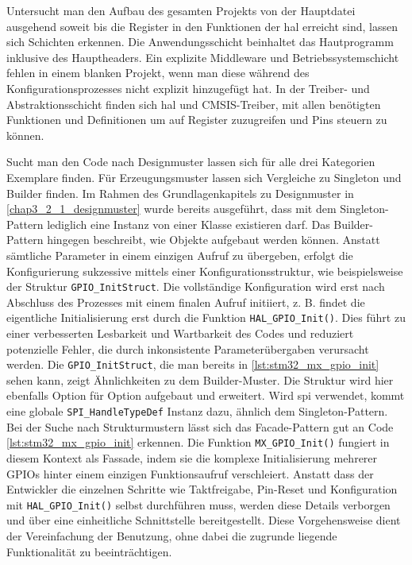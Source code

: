 Untersucht man den Aufbau des gesamten Projekts von der Hauptdatei ausgehend soweit bis die Register in den Funktionen der \gls{hal} erreicht sind, lassen sich Schichten erkennen.
Die Anwendungsschicht beinhaltet das Hautprogramm inklusive des Hauptheaders.
Ein explizite Middleware und Betriebssystemschicht fehlen in einem blanken Projekt, wenn man diese während des Konfigurationsprozesses nicht explizit hinzugefügt hat.
In der Treiber- und Abstraktionsschicht finden sich \gls{hal} und CMSIS-Treiber, mit allen benötigten Funktionen und Definitionen um auf Register zuzugreifen und Pins steuern zu können. 

Sucht man den Code nach Designmuster lassen sich für alle drei Kategorien Exemplare finden.
Für Erzeugungsmuster lassen sich Vergleiche zu Singleton und Builder finden.
Im Rahmen des Grundlagenkapitels zu Designmuster in \cref{chap3_2_1_designmuster} wurde bereits  ausgeführt, dass mit dem Singleton-Pattern lediglich eine Instanz von einer Klasse existieren darf.
Das Builder-Pattern hingegen beschreibt, wie Objekte aufgebaut werden können.
Anstatt sämtliche Parameter in einem einzigen Aufruf zu übergeben, erfolgt die Konfigurierung sukzessive mittels einer Konfigurationsstruktur, wie beispielsweise der Struktur \texttt{GPIO\_InitStruct}. 
Die vollständige Konfiguration wird erst nach Abschluss des Prozesses mit einem finalen Aufruf initiiert, z. B. findet die eigentliche Initialisierung erst durch die Funktion \texttt{HAL\_GPIO\_Init()}. 
Dies führt zu einer verbesserten Lesbarkeit und Wartbarkeit des Codes und reduziert potenzielle Fehler, die durch inkonsistente Parameterübergaben verursacht werden.
Die \texttt{GPIO\_InitStruct}, die man bereits in \cref{lst:stm32_mx_gpio_init} sehen kann, zeigt Ähnlichkeiten zu dem Builder-Muster.
Die Struktur wird hier ebenfalls Option für Option aufgebaut und erweitert.
Wird \gls{spi} verwendet, kommt eine globale \texttt{SPI\_HandleTypeDef} Instanz dazu, ähnlich dem Singleton-Pattern.
Bei der Suche nach Strukturmustern lässt sich das Facade-Pattern gut an Code \cref{lst:stm32_mx_gpio_init} erkennen.
Die Funktion \texttt{MX\_GPIO\_Init()} fungiert in diesem Kontext als Fassade, indem sie die komplexe Initialisierung mehrerer GPIOs hinter einem einzigen Funktionsaufruf verschleiert.
Anstatt dass der Entwickler die einzelnen Schritte wie Taktfreigabe, Pin-Reset und Konfiguration mit \texttt{HAL\_GPIO\_Init()} selbst durchführen muss, werden diese Details verborgen und über eine einheitliche Schnittstelle bereitgestellt. 
Diese Vorgehensweise dient der Vereinfachung der Benutzung, ohne dabei die zugrunde liegende Funktionalität zu beeinträchtigen.

